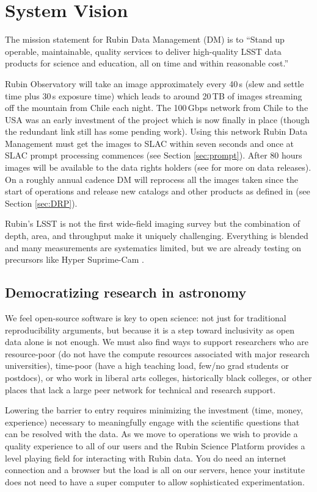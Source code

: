 \documentclass[11pt,twoside]{article}
\begin{document}
\section{System Vision}
The mission statement for Rubin Data Management (DM) is to ``Stand up operable, maintainable, quality services to deliver high-quality LSST data products for science and education, all on time and within reasonable cost.''

Rubin Observatory will take an image approximately every 40\,s (slew and settle time plus 30\,s exposure time) which leads to around 20\,TB of images streaming off the mountain from Chile each night.
The 100\,Gbps network from Chile to the USA was an early investment of the project which is now finally in place (though the redundant link still has some pending work).
Using this network Rubin Data Management must get the images to SLAC within seven seconds and once at SLAC prompt processing commences (see Section \ref{sec:prompt}).
After 80 hours images will be available to the data rights holders (see \citet{RDO-011} for more on data releases).
On a roughly annual cadence DM will reprocess all the images taken since the start of operations and release new catalogs and other products as defined in \citet{LSE-163} (see Section \ref{sec:DRP}).

Rubin's LSST is not the first wide-field imaging survey but the combination of depth, area, and throughput make it uniquely challenging.
Everything is blended and many measurements are systematics limited, but
we are already testing  on precursors like Hyper Suprime-Cam \citep[HSC;][]{2018PASJ...70S...5B}.


\subsection{Democratizing research in astronomy}

We feel open-source software is key to open science: not just for traditional reproducibility arguments, but because it is a step toward inclusivity as
open data alone is not enough.
We must also find ways to support researchers who are resource-poor (do not have the compute resources associated with major research universities), time-poor (have a high teaching load, few/no grad students or postdocs), or who work in liberal arts colleges, historically black colleges, or other places that lack a large peer network for technical and research support.

Lowering the barrier to entry requires minimizing the investment (time, money, experience) necessary to meaningfully engage with the scientific questions that can be resolved with the data.
As we move to operations we wish to provide a quality experience to all of our users and the Rubin Science Platform provides a level playing field for interacting with Rubin data.
You do need an internet connection and a browser but the load is all on our servers, hence your institute does not need to have a super computer to allow sophisticated experimentation.
\end{document}
